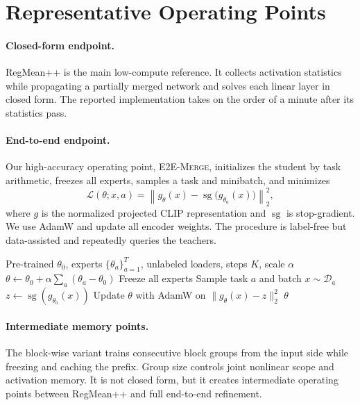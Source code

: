 \documentclass[letterpaper]{article} %
\newcommand{\method}{\textup{\textsc{E2E-Merge}}\xspace}
\theoremstyle{plain}
\theoremstyle{definition}
\begin{document}
\section{Representative Operating Points}
\label{sec:method}

\paragraph{Closed-form endpoint.}
RegMean++ is the main low-compute reference. It collects activation statistics while
propagating a partially merged network and solves each linear layer in closed form. The
reported implementation takes on the order of a minute after its statistics pass.

\paragraph{End-to-end endpoint.}
Our high-accuracy operating point, \method, initializes the student by task arithmetic,
freezes all experts, samples a task and minibatch, and minimizes
\begin{equation}
\mathcal L(\theta;x,a)=
\left\|g_\theta(x)-\operatorname{sg}\!\bigl(g_{\theta_a}(x)\bigr)\right\|_2^2,
\label{eq:method-loss}
\end{equation}
where $g$ is the normalized projected CLIP representation and $\operatorname{sg}$ is
stop-gradient. We use AdamW and update all encoder weights. The procedure is label-free
but data-assisted and repeatedly queries the teachers.

\begin{algorithm}[tb]
\caption{End-to-end representation distillation (\method)}
\label{alg:e2e}
\begin{algorithmic}[1]
\REQUIRE Pre-trained $\theta_0$, experts $\{\theta_a\}_{a=1}^T$, unlabeled loaders,
steps $K$, scale $\alpha$
\STATE $\theta\leftarrow\theta_0+\alpha\sum_a(\theta_a-\theta_0)$
\STATE Freeze all experts
    \STATE Sample task $a$ and batch $x\sim\mathcal D_a$
    \STATE $z\leftarrow\operatorname{sg}(g_{\theta_a}(x))$
    \STATE Update $\theta$ with AdamW on $\|g_\theta(x)-z\|_2^2$
\ENDFOR
\RETURN $\theta$
\end{algorithmic}
\end{algorithm}

\paragraph{Intermediate memory points.}
The block-wise variant trains consecutive block groups from the input side while freezing
and caching the prefix. Group size controls joint nonlinear scope and activation memory.
It is not closed form, but it creates intermediate operating points between RegMean++ and
full end-to-end refinement.
\end{document}
